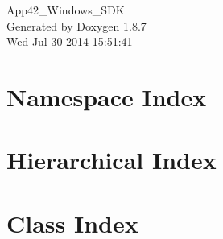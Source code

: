 \documentclass[twoside]{book}
\newcommand{\+}{\discretionary{\mbox{\scriptsize$\hookleftarrow$}}{}{}}
\newcommand{\clearemptydoublepage}{%
  \newpage{\pagestyle{empty}\cleardoublepage}%
}
\begin{document}
\hypersetup{pageanchor=false,
             bookmarks=true,
             bookmarksnumbered=true,
             pdfencoding=unicode
            }
\begin{titlepage}
\vspace*{7cm}
\begin{center}%
{\Large App42\+\_\+\+Windows\+\_\+\+S\+D\+K }\\
\vspace*{1cm}
{\large Generated by Doxygen 1.8.7}\\
\vspace*{0.5cm}
{\small Wed Jul 30 2014 15:51:41}\\
\end{center}
\end{titlepage}
\clearemptydoublepage
\tableofcontents
\clearemptydoublepage
{}
\hypersetup{pageanchor=true}

\chapter{Namespace Index}

\chapter{Hierarchical Index}

\chapter{Class Index}

\end{document}
